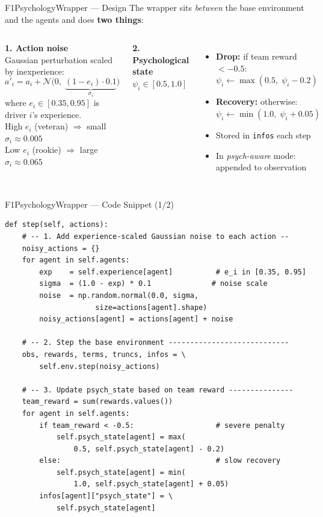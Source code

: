 \documentclass[10pt,aspectratio=169]{beamer}
\begin{document}
\begin{frame}[fragile]{F1PsychologyWrapper --- Design}
  The wrapper sits \emph{between} the base environment and the agents
  and does \textbf{two things}:

  \medskip
  \begin{columns}[T]
      \textbf{1. Action noise}\\
      Gaussian perturbation scaled by inexperience:
      \[
        a'_i = a_i + \mathcal{N}\!\bigl(0,\;
               \underbrace{(1-e_i)\cdot 0.1}_{\sigma_i}\bigr)
      \]
      where $e_i \in [0.35, 0.95]$ is driver $i$'s experience.\\[4pt]
      High $e_i$ (veteran) $\Rightarrow$ small $\sigma_i \approx 0.005$\\
      Low $e_i$ (rookie)   $\Rightarrow$ large $\sigma_i \approx 0.065$

      \textbf{2. Psychological state} $\psi_i \in [0.5, 1.0]$\\
      \begin{itemize}
        \item \textbf{Drop:} if team reward $< -0.5$:\;
              $\psi_i \leftarrow \max(0.5,\; \psi_i - 0.2)$
        \item \textbf{Recovery:} otherwise:\;
              $\psi_i \leftarrow \min(1.0,\; \psi_i + 0.05)$
        \item Stored in \texttt{infos} each step
        \item In \emph{psych-aware} mode: appended to observation
      \end{itemize}
  \end{columns}
\end{frame}

\begin{frame}[fragile]{F1PsychologyWrapper --- Code Snippet (1/2)}
\begin{lstlisting}
def step(self, actions):
    # -- 1. Add experience-scaled Gaussian noise to each action --
    noisy_actions = {}
    for agent in self.agents:
        exp    = self.experience[agent]          # e_i in [0.35, 0.95]
        sigma  = (1.0 - exp) * 0.1              # noise scale
        noise  = np.random.normal(0.0, sigma,
                     size=actions[agent].shape)
        noisy_actions[agent] = actions[agent] + noise

    # -- 2. Step the base environment ----------------------------
    obs, rewards, terms, truncs, infos = \
        self.env.step(noisy_actions)

    # -- 3. Update psych_state based on team reward ---------------
    team_reward = sum(rewards.values())
    for agent in self.agents:
        if team_reward < -0.5:                   # severe penalty
            self.psych_state[agent] = max(
                0.5, self.psych_state[agent] - 0.2)
        else:                                    # slow recovery
            self.psych_state[agent] = min(
                1.0, self.psych_state[agent] + 0.05)
        infos[agent]["psych_state"] = \
            self.psych_state[agent]
\end{lstlisting}
\end{frame}
\end{document}
